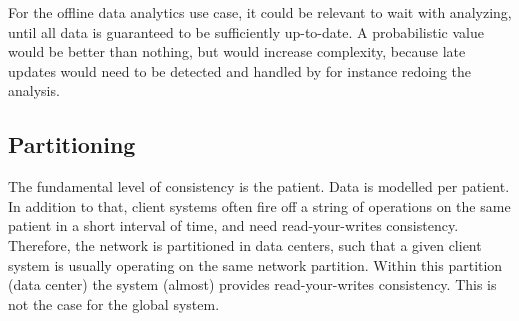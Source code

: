 \documentclass[11pt,a4paper]{report}
\begin{document}
For the offline data analytics use case, it could be relevant to wait with analyzing, until all data is guaranteed to be sufficiently up-to-date. A probabilistic value would be better than nothing, but would increase complexity, because late updates would need to be detected and handled by for instance redoing the analysis.

\subsection{Partitioning}
The fundamental level of consistency is the patient. Data is modelled per patient. 
In addition to that, client systems often fire off a string of operations on the same patient in a short interval of time, and need read-your-writes consistency. Therefore, the network is partitioned in data centers, such that a given client system is usually operating on the same network partition. Within this partition (data center) the system (almost) provides read-your-writes consistency. This is not the case for the global system.
\end{document}
